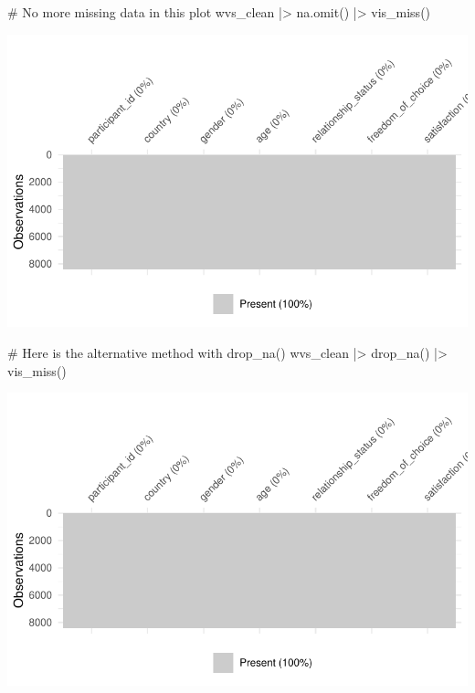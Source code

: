 \documentclass[
  letterpaper,
  DIV=11,
  numbers=noendperiod]{scrreprt}
\newenvironment{Shaded}{\begin{snugshade}}{\end{snugshade}}
\newcommand{\CommentTok}[1]{\textcolor[rgb]{0.37,0.37,0.37}{#1}}
\newcommand{\FunctionTok}[1]{\textcolor[rgb]{0.28,0.35,0.67}{#1}}
\newcommand{\NormalTok}[1]{\textcolor[rgb]{0.00,0.23,0.31}{#1}}
\newcommand{\SpecialCharTok}[1]{\textcolor[rgb]{0.37,0.37,0.37}{#1}}
\begin{document}
\begin{Shaded}
\begin{Highlighting}[]
\CommentTok{\# No more missing data in this plot}
\NormalTok{wvs\_clean }\SpecialCharTok{|\textgreater{}} \FunctionTok{na.omit}\NormalTok{() }\SpecialCharTok{|\textgreater{}} \FunctionTok{vis\_miss}\NormalTok{()}
\end{Highlighting}
\end{Shaded}

\includegraphics{07_data_wrangling_files/figure-pdf/remove-all-missing-data-1.pdf}

\begin{Shaded}
\begin{Highlighting}[]
\CommentTok{\# Here is the alternative method with drop\_na()}
\NormalTok{wvs\_clean }\SpecialCharTok{|\textgreater{}} \FunctionTok{drop\_na}\NormalTok{() }\SpecialCharTok{|\textgreater{}} \FunctionTok{vis\_miss}\NormalTok{()}
\end{Highlighting}
\end{Shaded}

\includegraphics{07_data_wrangling_files/figure-pdf/alternative-of-removing-all-missing-data-points-1.pdf}
\end{document}
